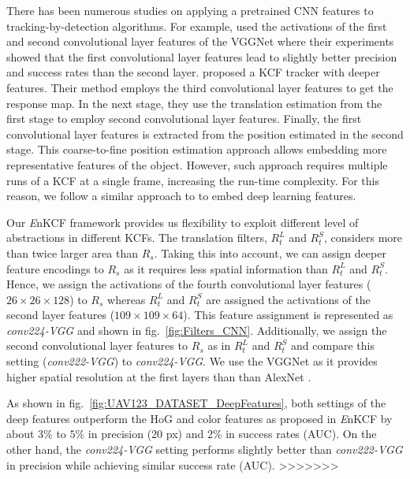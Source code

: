 \documentclass[10pt,twocolumn,letterpaper]{article}
\begin{document}
There has been numerous studies on applying a pretrained CNN features
to tracking-by-detection algorithms. For example, 
\cite{danelljan2015convolutional} used the activations of
the first and second convolutional layer features of the VGGNet
\cite{simonyan2014very} where their experiments showed that the first
convolutional layer features lead to slightly better precision and
success rates than the second layer. \cite{ma2015hierarchical}
proposed a KCF tracker with deeper features. Their method employs the
third convolutional layer features to get the response map. In the
next stage, they use the translation estimation from the first stage
to employ second convolutional layer features. Finally, the first
convolutional layer features is extracted from the position estimated
in the second stage. This coarse-to-fine position estimation approach
allows embedding more representative features of the object. However,
such approach requires multiple runs of a KCF at a single frame,
increasing the run-time complexity. For this reason, we follow a
similar approach to \cite{danelljan2015convolutional} to embed deep
learning features.

Our {\it E}nKCF framework provides us flexibility to exploit different
level of abstractions in different KCFs. The translation filters,
$R_{t}^{L}$ and $R_{t}^{S}$, considers more than twice larger area
than $R_{s}$. Taking this into account, we can assign deeper feature
encodings to $R_{s}$ as it requires less spatial information than
$R_{t}^{L}$ and $R_{t}^{S}$. Hence, we assign the activations of the
fourth convolutional layer features ($26\times26\times128$) to $R_{s}$
whereas $R_{t}^{L}$ and $R_{t}^{S}$ are assigned the activations of
the second layer features ($109\times109\times64$). This feature
assignment is represented as \textit{conv224-VGG} and shown in
fig.~\ref{fig:Filters_CNN}. Additionally, we assign the second
convolutional layer features to $R_{s}$ as in $R_{t}^{L}$ and
$R_{t}^{S}$ and compare this setting (\textit{conv222-VGG}) to
\textit{conv224-VGG}. We use the VGGNet as it provides higher spatial
resolution at the first layers than than AlexNet
\cite{krizhevsky2012imagenet}.

As shown in fig.~\ref{fig:UAV123_DATASET_DeepFeatures}, both settings
of the deep features outperform the HoG and color features as proposed
in {\it E}nKCF by about $3\%$ to $5\%$ in precision (20 px) and $2\%$
in success rates (AUC). On the other hand, the \textit{conv224-VGG}
setting performs slightly better than \textit{conv222-VGG} in
precision while achieving similar success rate (AUC).  >>>>>>>
\end{document}
